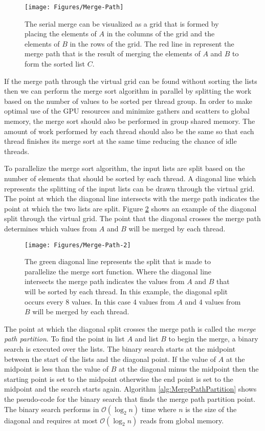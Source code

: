 \begin{figure}[h]
\centering
\texttt{[image: Figures/Merge-Path]}
\decoRule
\caption{The serial merge can be visualized as a grid that is formed by placing the elements of $A$ in the columns of the grid and the elements of $B$ in the rows of the grid. The red line in represent the merge path that is the result of merging the elements of $A$ and $B$ to form the sorted list $C$. }
\label{fig:Merge-Path}
\end{figure}

If the merge path through the virtual grid can be found without sorting the lists then we can perform the merge sort algorithm in parallel by splitting the work based on the number of values to be sorted per thread group. In order to make optimal use of the GPU resources and minimize gathers and scatters to global memory, the merge sort should also be performed in group shared memory. The amount of work performed by each thread should also be the same so that each thread finishes its merge sort at the same time reducing the chance of idle threads.

To parallelize the merge sort algorithm, the input lists are split based on the number of elements that should be sorted by each thread. A diagonal line which represents the splitting of the input lists can be drawn through the virtual grid. The point at which the diagonal line intersects with the merge path indicates the point at which the two lists are split. Figure \ref{fig:Merge-Path-2} shows an example of the diagonal split through the virtual grid. The point that the diagonal crosses the merge path determines which values from $A$ and $B$ will be merged by each thread.

\begin{figure}[H]
\centering
\texttt{[image: Figures/Merge-Path-2]}
\decoRule
\caption{The green diagonal line represents the split that is made to parallelize the merge sort function. Where the diagonal line intersects the merge path indicates the values from $A$ and $B$ that will be sorted by each thread. In this example, the diagonal split occurs every 8 values. In this case 4 values from $A$ and 4 values from $B$ will be merged by each thread.}
\label{fig:Merge-Path-2}
\end{figure}

The point at which the diagonal split crosses the merge path is called the \emph{merge path partition}. To find the point in list $A$ and list $B$ to begin the merge, a binary search is executed over the lists. The binary search starts at the midpoint between the start of the lists and the diagonal point. If the value of $A$ at the midpoint is less than the value of $B$ at the diagonal minus the midpoint then the starting point is set to the midpoint otherwise the end point is set to the midpoint and the search starts again. Algorithm \ref{alg:MergePathPartition} shows the pseudo-code for the binary search that finds the merge path partition point. The binary search performs in $\mathcal{O}(\log_2{n})$ time where $n$ is the size of the diagonal and requires at most $\mathcal{O}(\log_2{n})$ reads from global memory.

